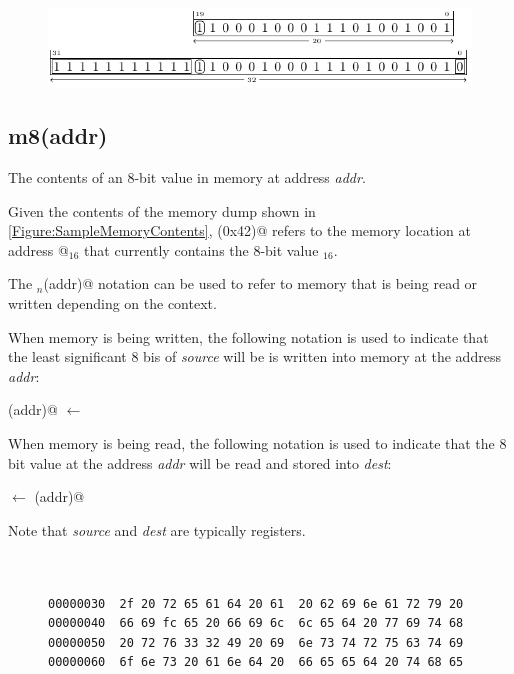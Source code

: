 \begin{figure}[ht]
  \centering
  \includegraphics{figures/chapter05/slzrNegative.pdf}
  \label{Figure:slzrNegative}
\end{figure}

\subsection{m8(addr)}
\label{memory:m8}

The contents of an 8-bit value in memory at address {\em addr}.

Given the contents of the memory dump shown in
\autoref{Figure:SampleMemoryContents},
(0x42)@ refers to the memory location at address @$_{16}$
that currently contains the 8-bit value \verb@fc@$_{16}$.

The \verb@m@$_n$\verb@(addr)@ notation can be used to refer to memory that is being
read or written depending on the context.

When memory is being written, the following notation is used to indicate that
the least significant 8 bis of {\em source} will be is written into memory at
the address {\em addr}:

(addr)@ $\leftarrow$ \verb@source@

When memory is being read, the following notation is used to indicate that the
8 bit value at the address {\em addr} will be read and stored into {\em dest}:

\verb@dest@ $\leftarrow$ (addr)@

Note that {\em source} and {\em dest} are typically registers.

\begin{figure}[ht]
\centering
\begin{BVerbatim}


00000030  2f 20 72 65 61 64 20 61  20 62 69 6e 61 72 79 20
00000040  66 69 fc 65 20 66 69 6c  6c 65 64 20 77 69 74 68
00000050  20 72 76 33 32 49 20 69  6e 73 74 72 75 63 74 69
00000060  6f 6e 73 20 61 6e 64 20  66 65 65 64 20 74 68 65
\end{BVerbatim}
\label{Figure:SampleMemoryContents}
\end{figure}

